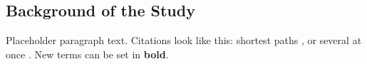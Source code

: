 \subsection{Background of the Study}
Placeholder paragraph text. Citations look like this: shortest paths \cite{dijkstra1959note}, or several at once \cite{cormen2009introduction, knuth1997art}. New terms can be set in \textbf{bold}.